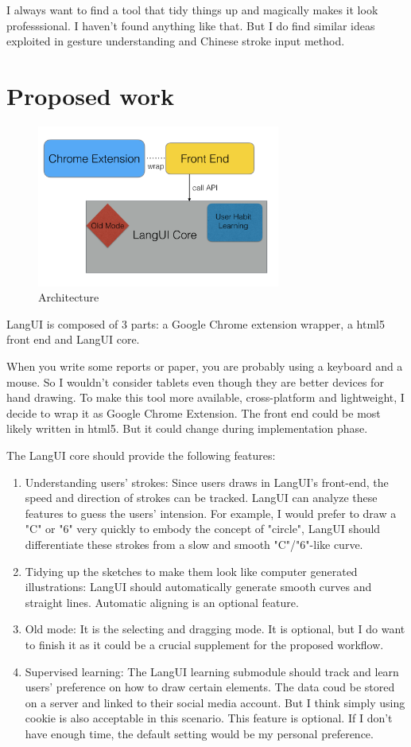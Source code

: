 \documentclass[10pt,conference, twocolumn]{IEEEtran}
\begin{document}
I always want to find a tool that tidy things up and magically makes it look professsional. I haven't found anything like that. But I do find similar ideas exploited in gesture understanding and Chinese stroke input method.


\section{Proposed work}
\begin{figure}[H]
\caption{Architecture}
\includegraphics[width=8cm]{5.png}
\end{figure}

LangUI is composed of 3 parts: a Google Chrome extension wrapper, a html5 front end and LangUI core.

When you write some reports or paper, you are probably using a keyboard and a mouse. So I wouldn't consider tablets even though they are better devices for hand drawing. To make this tool more available,  cross-platform and lightweight, I decide to wrap it as Google Chrome Extension. The front end could be most likely written in html5. But it could change during implementation phase.

The LangUI core should provide the following features:

\begin{enumerate}
  \item Understanding users' strokes: Since users draws in LangUI's front-end, the speed and direction of strokes can be tracked. LangUI can analyze these features to guess the users' intension. For example, I would prefer to draw a "C" or "6" very quickly to embody the concept of "circle", LangUI should differentiate these strokes from a slow and smooth "C"/"6"-like curve.
  \item Tidying up the sketches to make them look like computer generated illustrations: LangUI should automatically generate smooth curves and straight lines. Automatic aligning is an optional feature.
  \item Old mode: It is the selecting and dragging mode. It is optional, but I do want to finish it as it could be a crucial supplement for the proposed workflow.
  \item Supervised learning: The LangUI learning submodule should track and learn users' preference on how to draw certain elements. The data coud be stored on a server and linked to their social media account. But I think simply using cookie is also acceptable in this scenario.  This feature is optional. If I don't have enough time, the default setting would be my personal preference.
\end{enumerate}
\end{document}
